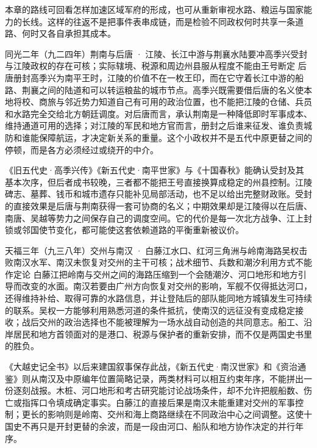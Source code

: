 本章的路线可回看怎样加速区域军府的形成，也可从重新审视水路、粮运与国家能力的长线。这样的往返不是把事件表串成链，而是检验不同政权何时共享一条道路、何时又各自承担其成本。

\begin{event}{}{同光二年（九二四年）}{荆南与后唐 · 江陵、长江中游与荆襄水陆要冲}{高季兴受封与江陵政权的存在可核；实际辖境、税源和周边州县服从程度不能由王号断定}
后唐册封高季兴为南平王时，江陵的价值不在一枚王印，而在它守着长江中游的船路、荆襄之间的陆道和可以转运粮盐的城市节点。高季兴既需要借后唐的名义使本地将校、商旅与邻近势力知道自己有可用的政治位置，也不能把江陵的仓储、兵员和水路完全交给北方朝廷调度。对后唐而言，承认荆南是一种降低即时军事成本、维持通道可用的选择；对江陵的军民和地方官而言，册封之后谁来征发、谁负责城防和谁能保障航运，才决定新关系的重量。这个小政权并不是五代中原更替之间的停顿，而是各方必须经过或绕开的中介。

《旧五代史·高季兴传》《新五代史·南平世家》与《十国春秋》能确认受封及其基本次序，但后者成书较晚，三者都不能把王号直接换算成稳定的州县控制。江陵碑志、墓葬、钱币和城市遗存只能补见局部活动，也不足以给出完整财政账。受封的直接效果是后唐与荆南获得一套可协商的名义；中期效果却是江陵得以在后唐、南唐、吴越等势力之间保存自己的调度空间。它的代价是每一次北方战争、江上封锁或邻国使节变化，都可能使这套依赖道路的平衡重新被议价。
\end{event}

\begin{event}{}{天福三年（九三八年）}{交州与南汉 · 白藤江水口、红河三角洲与岭南海路}{吴权击败南汉水军、南汉未恢复对交州的主干可核；战术细节、兵数和潮汐利用方式不能作定论}
白藤江把岭南与交州之间的海路压缩到一个会随潮汐、河口地形和地方引导而改变的水面。南汉若要由广州方向恢复对交州的影响，军舰不仅得抵达河口，还得维持补给、取得可靠的水路信息，并让登陆后的部队能同地方城镇发生可持续的联系。吴权一方能够利用熟悉河道的条件抵抗，使南汉的远征没有变成稳定接收；战后交州的政治选择也不能被理解为一场水战自动创造的共同意志。船工、沿岸居民和地方首领面对的是港口、税源与保护者的重新安排，而不仅是两国史书里的胜负。

《大越史记全书》以后来建国叙事保存此战，《新五代史·南汉世家》和《资治通鉴》则从南汉及中原编年位置简略记录，两类材料可以相互约束年序，不能拼出一份逐刻战报。木桩、河口地形和考古研究能讨论战场条件，却不允许把舰船数、伤亡或指挥口令填成确定事实。白藤江的直接后果是南汉未能重建对交州的军事控制；更长的影响则是岭南、交州和海上商路继续在不同政治中心之间调整。这使十国史不再只是开封更替的余波，而是一段由河口、船队和地方协作决定的并行年序。
\end{event}
